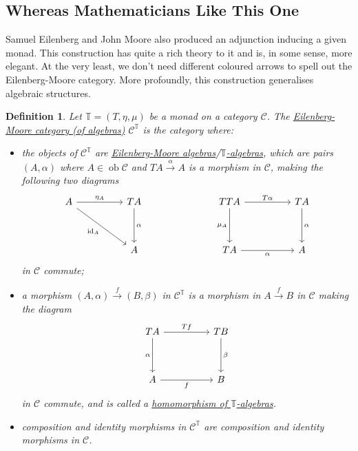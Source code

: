 \documentclass[a4paper,11pt]{article}
\theoremstyle{break_italics}
\newtheorem*{definition*}{Definition}
\theoremstyle{break_upright}
\theoremstyle{remark}
\newcommand{\id}{\mathrm{id}}
\newcommand{\ob}{\operatorname{ob}}
\newcommand{\C}{\mathcal{C}}
\begin{document}
\subsection{Whereas Mathematicians Like This One}

Samuel Eilenberg and John Moore also produced an adjunction inducing a given monad. This construction has quite a rich theory to it and is, in some sense, more elegant. At the very least, we don't need different coloured arrows to spell out the Eilenberg-Moore category. More profoundly, this construction generalises algebraic structures.

\begin{definition*}
	Let $\mathbb T = (T, \eta, \mu)$ be a monad on a category $\C$. The \uline{Eilenberg-Moore category (of algebras)} $\C^{\mathbb T}$ is the category where:
	\begin{itemize}
		\item the objects of $\C^{\mathbb T}$ are \uline{Eilenberg-Moore algebras}/\uline{$\mathbb T$-algebras}, which are pairs $(A, \alpha)$ where $A \in \ob\C$ and $TA \xrightarrow{\alpha} A$ is a morphism in $\C$, making the following two diagrams
			\[
\begin{tikzcd}
A \arrow[rr, "\eta_A"] \arrow[rrdd, "\id_A"'] &  & TA \arrow[dd, "\alpha"] &  &  & TTA \arrow[rr, "T\alpha"] \arrow[dd, "\mu_A"'] &  & TA \arrow[dd, "\alpha"] \\
                                              &  &                         &  &  &                                                &  &                         \\
                                              &  & A                       &  &  & TA \arrow[rr, "\alpha"']                       &  & A                      
\end{tikzcd}
			\]
			in $\C$ commute;
		\item a morphism $(A, \alpha) \xrightarrow{f} (B,\beta)$ in $\C^{\mathbb T}$ is a morphism in $A \xrightarrow{f} B$ in $\C$ making the diagram
			\[
\begin{tikzcd}
TA \arrow[dd, "\alpha"'] \arrow[rr, "Tf"] &  & TB \arrow[dd, "\beta"] \\
                                          &  &                        \\
A \arrow[rr, "f"']                        &  & B                     
\end{tikzcd}
			\]
			in $\C$ commute, and is called a \uline{homomorphism of $\mathbb T$-algebras}.
		\item composition and identity morphisms in $\C^{\mathbb T}$ are composition and identity morphisms in $\C$.
	\end{itemize}
\end{definition*}
\end{document}
